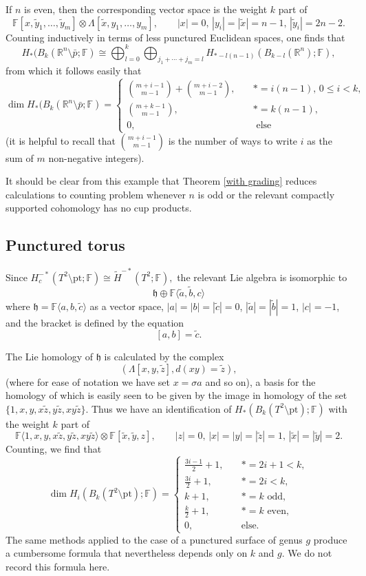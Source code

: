 \documentclass{compositio}
\theoremstyle{definition}\newtheorem{definition}{Definition}[section]
\theoremstyle{theorem}\newtheorem{lemma}[definition]{Lemma}
\theoremstyle{remark}\newtheorem*{conventions}{Conventions}
\theoremstyle{remark}\newtheorem*{acknowledgments}{Acknowledgments}
\theoremstyle{remark}\newtheorem*{outline}{Outline}
\theoremstyle{remark}\newtheorem*{questions}{Questions}
\theoremstyle{remark}\newtheorem{example}[definition]{Example}
\theoremstyle{definition}\newtheorem{construction}[definition]{Construction}
\theoremstyle{definition}\newtheorem*{convention}{Convention}
\theoremstyle{definition}\newtheorem*{conjecture}{Conjecture}
\theoremstyle{theorem}\newtheorem{theorem}[definition]{Theorem}
\theoremstyle{theorem}\newtheorem{paradigm}[definition]{Paradigm}
\theoremstyle{remark}\newtheorem{remark}[definition]{Remark}
\theoremstyle{corollary}\newtheorem{corollary}[definition]{Corollary}
\theoremstyle{theorem}\newtheorem{proposition}[definition]{Proposition}
\theoremstyle{definition}\newtheorem{question}[definition]{Question}
\begin{document}
If $n$ is even, then the corresponding vector space is the weight $k$ part of $$\mathbb{F}[x, \tilde y_1,\ldots, \tilde y_m]\otimes\Lambda[\tilde x, y_1,\ldots, y_m],\qquad |x|=0,\,|y_i|=|\tilde x|=n-1,\, |\tilde y_i|=2n-2.$$ Counting inductively in terms of less punctured Euclidean spaces, one finds that $$H_*(B_k(\mathbb{R}^n\setminus \bar p;\mathbb{F})\cong \bigoplus_{l=0}^k\bigoplus_{j_1+\cdots+j_m=l} H_{*-l(n-1)}(B_{k-l}(\mathbb{R}^n);\mathbb{F}),$$ from which it follows easily that $$\dim H_*(B_k(\mathbb{R}^n\setminus \bar p;\mathbb{F})=\begin{cases}
\binom{m+i-1}{m-1}+\binom{m+i-2}{m-1}, \quad &*=i(n-1), \, 0\leq i<k,\\	
\binom{m+k-1}{m-1},\quad &*=k(n-1),\\
0,\quad &\text{ else}
\end{cases}$$ (it is helpful to recall that $\binom{m+i-1}{m-1}$ is the number of ways to write $i$ as the sum of $m$ non-negative integers).

It should be clear from this example that Theorem \ref{with grading} reduces calculations to counting problem whenever $n$ is odd or the relevant compactly supported cohomology has no cup products.

\subsection{Punctured torus}
Since $H_c^{-*}(T^2\setminus \mathrm{pt};\mathbb{F})\cong \widetilde H^{-*}(T^2;\mathbb{F}),$ the relevant Lie algebra is isomorphic to $$\mathfrak{h}\oplus \mathbb{F}\langle \tilde a, \tilde b, c\rangle$$ where $\mathfrak{h}=\mathbb{F}\langle a, b, \tilde c\rangle$ as a vector space, $|a|=|b|=|\tilde c|=0$, $|\tilde a|=|\tilde b|=1$, $|c|=-1$, and the bracket is defined by the equation $$[a,b]=\tilde c.$$

The Lie homology of $\mathfrak{h}$ is calculated by the complex $$(\Lambda[ x, y, \tilde z], d(xy)=\tilde z),$$ (where for ease of notation we have set $x=\sigma a$ and so on), a basis for the homology of which is easily seen to be given by the image in homology of the set $\{1,x, y, x\tilde z,  y\tilde z, xy\tilde z\}.$ Thus we have an identification of $H_*(B_k(T^2\setminus \mathrm{pt});\mathbb{F})$ with the weight $k$ part of $$\mathbb{F}\langle 1,x,y,x\tilde z,y\tilde z,xy\tilde z\rangle\otimes \mathbb{F}[\tilde x,\tilde y,z],\qquad |z|=0,\, |x|=|y|=|\tilde z|=1,\,|\tilde x|=|\tilde y|=2.$$ Counting, we find that $$\dim H_i(B_k(T^2\setminus\mathrm{pt});\mathbb{F})=\begin{cases}
\frac{3i-1}{2}+1,\quad &*=2i+1<k,\\
\frac{3i}{2}+1,\quad &*=2i<k,\\
k+1,\quad &*=k \text{ odd,}\\
\frac{k}{2}+1,\quad &*=k \text{ even,}\\
0,\quad &\text{else.}
\end{cases}$$ The same methods applied to the case of a punctured surface of genus $g$ produce a cumbersome formula that nevertheless depends only on $k$ and $g$. We do not record this formula here.
\end{document}
